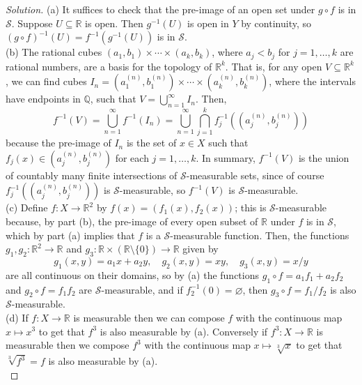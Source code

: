 \documentclass[10pt]{article}
\providecommand{\QQ}{\mathbb Q}
\providecommand{\RR}{\mathbb R}
\providecommand{\inv}{^{-1}}
\newenvironment{soln}{\begin{proof}[Solution]}{\end{proof}}
\begin{document}
\begin{soln}
    (a) It suffices to check that the pre-image of an open set
    under $g\circ f$ is in $\mathcal S$.
    Suppose $U\subseteq\RR$ is open. Then
    $g\inv(U)$ is open in $Y$ by continuity,
    so $(g\circ f)\inv(U) = f\inv(g\inv(U))$ is in $\mathcal S$.\\

    (b) The rational cubes $(a_1,b_1)\times\cdots\times(a_k,b_k)$,
    where $a_j<b_j$ for $j=1,\dots,k$ are rational numbers,
    are a basis for the topology of $\RR^k$.
    That is, for any open $V\subseteq\RR^k$, we can find cubes
    $I_n = (a^{(n)}_1, b^{(n)}_1)\times\cdots\times(a^{(n)}_k,b^{(n)}_k)$,
    where the intervals have endpoints in $\QQ$,
    such that $V = \bigcup_{n=1}^\infty I_n$. Then,
    \begin{equation*}
	f\inv(V) = \bigcup_{n=1}^\infty f\inv(I_n) =
	\bigcup_{n=1}^\infty \bigcap_{j=1}^k f_j\inv((a^{(n)}_j,b^{(n)}_j))
    \end{equation*}
    because the pre-image of $I_n$ is the set of $x\in X$ such that
    $f_j(x)\in(a^{(n)}_j,b^{(n)}_j)$ for each $j=1,\dots,k$.
    In summary, $f\inv(V)$ is the union of countably many
    finite intersections of $\mathcal S$-measurable sets,
    since of course $f_j\inv((a_j^{(n)},b_j^{(n)}))$ is $\mathcal S$-measurable,
    so $f\inv(V)$ is $\mathcal S$-measurable.\\

    (c) Define $f\colon X\to\RR^2$ by $f(x) = (f_1(x), f_2(x))$;
    this is $\mathcal S$-measurable because, by part (b),
    the pre-image of every open subset of $\RR$ under $f$ is in $\mathcal S$,
    which by part (a) implies that $f$ is a $\mathcal S$-measurable function.
    Then, the functions $g_1,g_2\colon\RR^2\to\RR$ and
    $g_3\colon\RR\times(\RR\setminus\{0\})\to\RR$ given by
    \begin{equation*}
        g_1(x,y) = a_1x+a_2y,\quad g_2(x,y) = xy,\quad g_3(x,y) = x/y
    \end{equation*}
    are all continuous on their domains, so by (a)
    the functions $g_1\circ f = a_1f_1 + a_2f_2$
    and $g_2\circ f = f_1f_2$ are $\mathcal S$-measurable,
    and if $f_2\inv(0)=\varnothing$,
    then $g_3\circ f = f_1/f_2$ is also $\mathcal S$-measurable.\\

    (d) If $f\colon X\to\RR$ is measurable then we can compose $f$
    with the continuous map $x\mapsto x^3$ to get that $f^3$ 
    is also measurable by (a). Conversely if $f^3\colon X\to\RR$ is measurable
    then we compose $f^3$ with the continuous map $x\mapsto\sqrt[3]{x}$
    to get that $\sqrt[3]{f^3} = f$ is also measurable by (a).\\


\end{soln}
\end{document}
